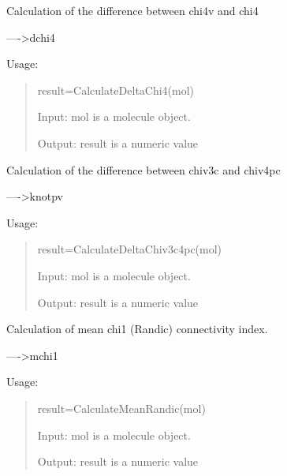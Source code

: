 \documentclass[letterpaper,10pt,english]{sphinxmanual}
\begin{document}

\begin{fulllineitems}
\label{reference/connectivity:connectivity.CalculateDeltaChi4}
Calculation of the difference between chi4v and chi4

----\textgreater{}dchi4

Usage:
\begin{quote}

result=CalculateDeltaChi4(mol)

Input: mol is a molecule object.

Output: result is a numeric value
\end{quote}

\end{fulllineitems}


\begin{fulllineitems}
\label{reference/connectivity:connectivity.CalculateDeltaChiv3c4pc}
Calculation of the difference between chiv3c and chiv4pc

----\textgreater{}knotpv

Usage:
\begin{quote}

result=CalculateDeltaChiv3c4pc(mol)

Input: mol is a molecule object.

Output: result is a numeric value
\end{quote}

\end{fulllineitems}


\begin{fulllineitems}
\label{reference/connectivity:connectivity.CalculateMeanRandic}
Calculation of mean chi1 (Randic) connectivity index.

----\textgreater{}mchi1

Usage:
\begin{quote}

result=CalculateMeanRandic(mol)

Input: mol is a molecule object.

Output: result is a numeric value
\end{quote}

\end{fulllineitems}
\end{document}
